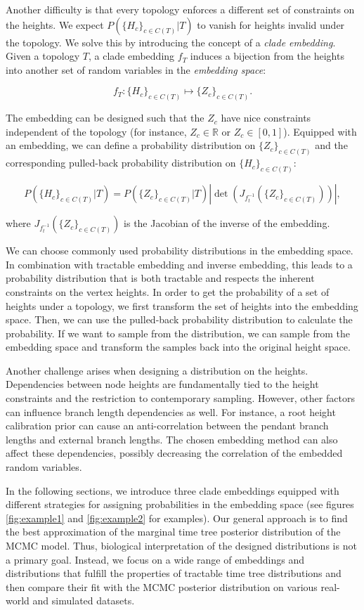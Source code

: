\documentclass[10pt,letterpaper]{article}
\begin{document}
Another difficulty is that every topology enforces a different set of constraints on the heights. We expect $P\left(\{H_c\}_{c \in C(T)} | T\right)$ to vanish for heights invalid under the topology. We solve this by introducing the concept of a \emph{clade embedding}. Given a topology $T$, a clade embedding $f_T$ induces a bijection from the heights into another set of random variables in the \emph{embedding space}:

$$
f_T: \{H_c\}_{c \in C(T)} \mapsto \{Z_c\}_{c \in C(T)}.
$$

The embedding can be designed such that the $Z_c$ have nice constraints independent of the topology (for instance, $Z_c \in \mathbb{R}$ or $Z_c \in [0, 1]$). Equipped with an embedding, we can define a probability distribution on $\{Z_c\}_{c \in C(T)}$ and the corresponding pulled-back probability distribution on $\{H_c\}_{c \in C(T)}$:

$$
P\left(\{H_c\}_{c \in C(T)} | T\right) = P\left(\{Z_c\}_{c \in C(T)} | T\right) \left| \det{\left(J_{f_t^{-1}}(\{Z_c\}_{c \in C(T)})\right)} \right|,
$$

where $J_{f_t^{-1}}(\{Z_c\}_{c \in C(T)})$ is the Jacobian of the inverse of the embedding.

We can choose commonly used probability distributions in the embedding space. In combination with tractable embedding and inverse embedding, this leads to a probability distribution that is both tractable and respects the inherent constraints on the vertex heights. In order to get the probability of a set of heights under a topology, we first transform the set of heights into the embedding space. Then, we can use the pulled-back probability distribution to calculate the probability. If we want to sample from the distribution, we can sample from the embedding space and transform the samples back into the original height space.

Another challenge arises when designing a distribution on the heights. Dependencies between node heights are fundamentally tied to the height constraints and the restriction to contemporary sampling. However, other factors can influence branch length dependencies as well. For instance, a root height calibration prior can cause an anti-correlation between the pendant branch lengths and external branch lengths. The chosen embedding method can also affect these dependencies, possibly decreasing the correlation of the embedded random variables.

In the following sections, we introduce three clade embeddings equipped with different strategies for assigning probabilities in the embedding space (see figures \ref{fig:example1} and \ref{fig:example2} for examples). Our general approach is to find the best approximation of the marginal time tree posterior distribution of the MCMC model. Thus, biological interpretation of the designed distributions is not a primary goal. Instead, we focus on a wide range of embeddings and distributions that fulfill the properties of tractable time tree distributions and then compare their fit with the MCMC posterior distribution on various real-world and simulated datasets.
\end{document}
